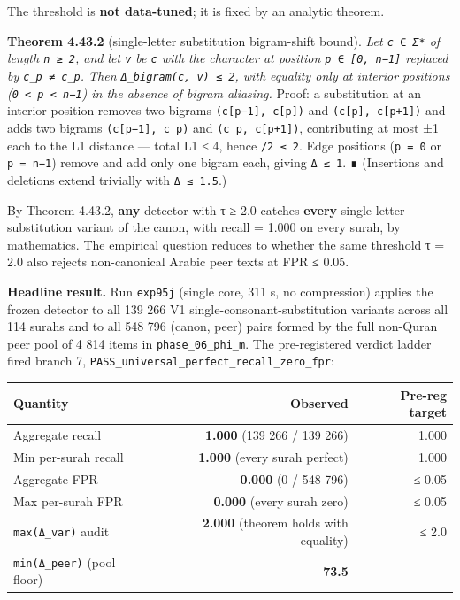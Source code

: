 \documentclass[
]{article}
\newcounter{none} %
\begin{document}
The threshold is \textbf{not data-tuned}; it is fixed by an analytic
theorem.

\textbf{Theorem 4.43.2} (single-letter substitution bigram-shift bound).
\emph{Let \texttt{c\ ∈\ Σ*} of length \texttt{n\ ≥\ 2}, and let
\texttt{v} be \texttt{c} with the character at position
\texttt{p\ ∈\ {[}0,\ n−1{]}} replaced by
\texttt{c\textquotesingle{}\_p\ ≠\ c\_p}. Then
\texttt{Δ\_bigram(c,\ v)\ ≤\ 2}, with equality only at interior
positions (\texttt{0\ \textless{}\ p\ \textless{}\ n−1}) in the absence
of bigram aliasing.} Proof: a substitution at an interior position
removes two bigrams \texttt{(c{[}p−1{]},\ c{[}p{]})} and
\texttt{(c{[}p{]},\ c{[}p+1{]})} and adds two bigrams
\texttt{(c{[}p−1{]},\ c\textquotesingle{}\_p)} and
\texttt{(c\textquotesingle{}\_p,\ c{[}p+1{]})}, contributing at most ±1
each to the L1 distance --- total L1 ≤ 4, hence \texttt{/2\ ≤\ 2}. Edge
positions (\texttt{p\ =\ 0} or \texttt{p\ =\ n−1}) remove and add only
one bigram each, giving \texttt{Δ\ ≤\ 1}. ∎ (Insertions and deletions
extend trivially with \texttt{Δ\ ≤\ 1.5}.)

By Theorem 4.43.2, \textbf{any} detector with τ ≥ 2.0 catches
\textbf{every} single-letter substitution variant of the canon, with
recall = 1.000 on every surah, by mathematics. The empirical question
reduces to whether the same threshold τ = 2.0 also rejects non-canonical
Arabic peer texts at FPR ≤ 0.05.

\textbf{Headline result.} Run \texttt{exp95j} (single core, 311 s, no
compression) applies the frozen detector to all 139 266 V1
single-consonant-substitution variants across all 114 surahs and to all
548 796 (canon, peer) pairs formed by the full non-Quran peer pool of 4
814 items in \texttt{phase\_06\_phi\_m}. The pre-registered verdict
ladder fired branch 7,
\texttt{PASS\_universal\_perfect\_recall\_zero\_fpr}:

{\def\LTcaptype{none} %
\begin{longtable}[]{@{}lrr@{}}
\toprule\noalign{}
Quantity & Observed & Pre-reg target \\
\midrule\noalign{}
\endhead
\bottomrule\noalign{}
\endlastfoot
Aggregate recall & \textbf{1.000} (139 266 / 139 266) & 1.000 \\
Min per-surah recall & \textbf{1.000} (every surah perfect) & 1.000 \\
Aggregate FPR & \textbf{0.000} (0 / 548 796) & ≤ 0.05 \\
Max per-surah FPR & \textbf{0.000} (every surah zero) & ≤ 0.05 \\
\texttt{max(Δ\_var)} audit & \textbf{2.000} (theorem holds with
equality) & ≤ 2.0 \\
\texttt{min(Δ\_peer)} (pool floor) & \textbf{73.5} & --- \\
\end{longtable}
}
\end{document}
